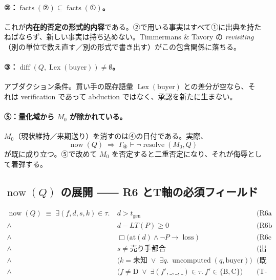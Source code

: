 \documentclass[11pt,a4paper]{article}
\newcommand{\resolve}{\operatorname{resolve}}
\newcommand{\now}{\operatorname{now}}
\newcommand{\facts}{\operatorname{facts}}
\newcommand{\Lex}{\operatorname{Lex}}
\newcommand{\diff}{\operatorname{diff}}
\newcommand{\uncomputed}{\operatorname{uncomputed}}
\newcommand{\loss}{\operatorname{loss}}
\newcommand{\LT}{\mathit{LT}}
\begin{document}
\paragraph{②：$\facts(②) \subseteq \facts(①)$。}
これが\textbf{内在的否定の形式的内容}である。②で用いる事実はすべて①に出典を持たねばならず、新しい事実は持ち込めない。Timmermans \& Tavory の \textit{revisiting}（別の単位で数え直す／別の形式で書き出す）がこの包含関係に落ちる。

\paragraph{③：$\diff(Q, \Lex(\text{buyer})) \neq \emptyset$。}
アブダクション条件。買い手の既存語彙 $\Lex(\text{buyer})$ との差分が空なら、それは verification であって abduction ではなく、承認を新たに生まない。

\paragraph{⑤：量化域から $M_0$ が除かれている。}
$M_0$（現状維持／来期送り）を消すのは④の日付である。実際、
\[
\now(Q) \;\Longrightarrow\; \Gamma_{④} \vdash \neg\resolve(M_0, Q)
\]
が既に成り立つ。⑤で改めて $M_0$ を否定すると二重否定になり、それが侮辱として着弾する。

\subsection{$\now(Q)$ の展開 ―― R6 とT軸の必須フィールド}

\begin{equation}
\begin{aligned}
\now(Q) \;\equiv\; \exists (f,d,s,k) \in \tau.\
& d > t_{\mathrm{gen}} && \text{(R6a\ 未来性)} \\
\wedge\ & d - \LT(P) \geq 0 && \text{(R6b\ リードタイム整合)} \\
\wedge\ & \Box\bigl(\mathrm{at}(d) \wedge \neg P \to \loss\bigr) && \text{(R6c\ 因果接続)} \\
\wedge\ & s \neq \text{売り手都合} && \text{(出典階層)} \\
\wedge\ & \bigl(k = \text{未知} \;\vee\; \exists q.\ \uncomputed(q,\text{buyer})\bigr) && \text{(既知度)} \\
\wedge\ & \bigl(f \neq \mathrm{D} \;\vee\; \exists (f',\_,\_,\_) \in \tau.\ f' \in \{\mathrm{B},\mathrm{C}\}\bigr) && \text{(T-D単独禁止)}
\end{aligned}
\end{equation}
\end{document}
